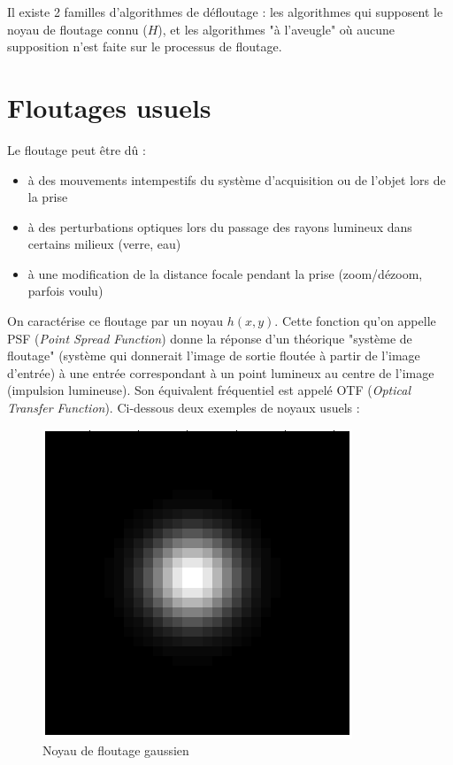 \documentclass{article}
\begin{document}
	Il existe 2 familles d'algorithmes de défloutage : les algorithmes qui supposent le noyau de floutage connu ($H$), et les algorithmes "à l'aveugle" où aucune supposition n'est faite sur le processus de floutage.
	
	

\section{Floutages usuels}

	Le floutage peut être dû : 
	\begin{itemize}
	\item à des mouvements intempestifs du système d'acquisition ou de l'objet lors de la prise
	\item à des perturbations optiques lors du passage des rayons lumineux dans certains milieux (verre, eau)
	\item à une modification de la distance focale pendant la prise (zoom/dézoom, parfois voulu)
	\end{itemize}

	On caractérise ce floutage par un noyau $h(x,y)$. Cette fonction qu'on appelle PSF (\textit{Point Spread Function}) donne la réponse d'un théorique "système de floutage" (système qui donnerait l'image de sortie floutée à partir de l'image d'entrée) à une entrée correspondant à un point lumineux au centre de l'image (impulsion lumineuse). Son équivalent fréquentiel est appelé OTF (\textit{Optical Transfer Function}). Ci-dessous deux exemples de noyaux usuels :
	
	\begin{figure}[h]
		\begin{center}			
			\includegraphics[scale=0.3]{Img/blurkernel_gauss}
		\end{center}
		\caption{Noyau de floutage gaussien}
	\end{figure}
\end{document}
